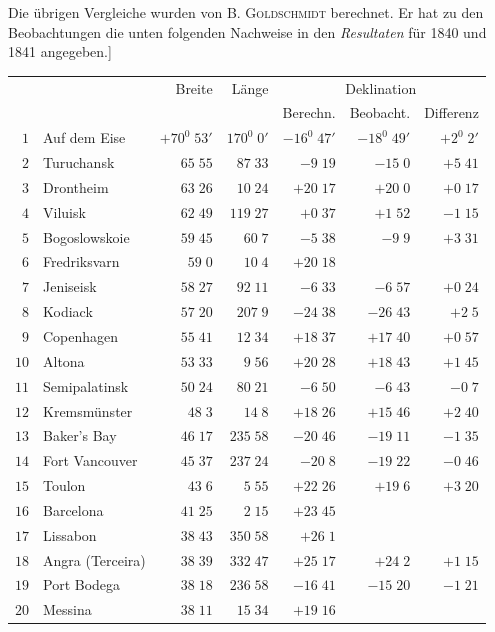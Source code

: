 Die übrigen Vergleiche wurden von \textsc{B. Goldschmidt} berechnet. Er hat zu den Beobachtungen die unten folgenden Nachweise in den \textit{Resultaten} für 1840 und 1841 angegeben.]
\clearpage
{}
\begingroup
\fontsize{9}{10.2}\selectfont
\setlength{\tabcolsep}{1.5pt}
\renewcommand{\arraystretch}{1.02}
\begin{center}
\begin{tabular}{rl|r|r||r|r|r}
\hline
&&Breite&Länge&\multicolumn{3}{c}{Deklination}\\
&&&&Berechn.&Beobacht.&Differenz\\\hline
$1$&Auf dem Eise&$+70^0\;53'$&$170^0\;0'$&$-16^0\;47'$&$-18^0\;49'$&$+2^0\;2'$\\
$2$&Turuchansk&$65\;55$&$87\;33$&$-9\;19$&$-15\;0$&$+5\;41$\\
$3$&Drontheim&$63\;26$&$10\;24$&$+20\;17$&$+20\;0$&$+0\;17$\\
$4$&Viluisk&$62\;49$&$119\;27$&$+0\;37$&$+1\;52$&$-1\;15$\\
$5$&Bogoslowskoie&$59\;45$&$60\;7$&$-5\;38$&$-9\;9$&$+3\;31$\\
$6$&Fredriksvarn&$59\;0$&$10\;4$&$+20\;18$&&\\
$7$&Jeniseisk&$58\;27$&$92\;11$&$-6\;33$&$-6\;57$&$+0\;24$\\
$8$&Kodiack&$57\;20$&$207\;9$&$-24\;38$&$-26\;43$&$+2\;5$\\
$9$&Copenhagen&$55\;41$&$12\;34$&$+18\;37$&$+17\;40$&$+0\;57$\\
$10$&Altona&$53\;33$&$9\;56$&$+20\;28$&$+18\;43$&$+1\;45$\\[2pt]
$11$&Semipalatinsk&$50\;24$&$80\;21$&$-6\;50$&$-6\;43$&$-0\;7$\\
$12$&Kremsmünster&$48\;3$&$14\;8$&$+18\;26$&$+15\;46$&$+2\;40$\\
$13$&Baker’s Bay&$46\;17$&$235\;58$&$-20\;46$&$-19\;11$&$-1\;35$\\
$14$&Fort Vancouver&$45\;37$&$237\;24$&$-20\;8$&$-19\;22$&$-0\;46$\\
$15$&Toulon&$43\;6$&$5\;55$&$+22\;26$&$+19\;6$&$+3\;20$\\
$16$&Barcelona&$41\;25$&$2\;15$&$+23\;45$&&\\
$17$&Lissabon&$38\;43$&$350\;58$&$+26\;1$&&\\
$18$&Angra (Terceira)&$38\;39$&$332\;47$&$+25\;17$&$+24\;2$&$+1\;15$\\
$19$&Port Bodega&$38\;18$&$236\;58$&$-16\;41$&$-15\;20$&$-1\;21$\\
$20$&Messina&$38\;11$&$15\;34$&$+19\;16$&&\\[2pt]

\end{tabular}
\end{center}
